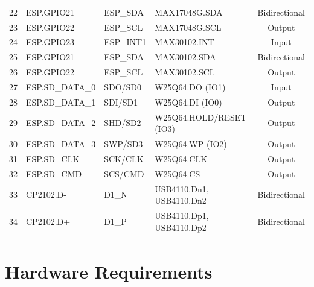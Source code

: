 \documentclass[10pt]{datasheet}
\begin{document}
\begin{longtable}{c | l | l | >{\raggedright\arraybackslash}p{4.5cm} | c}
    22 & ESP.GPIO21      & ESP\_SDA         & MAX17048G.SDA            & Bidirectional \\
    23 & ESP.GPIO22      & ESP\_SCL         & MAX17048G.SCL            & Output \\
    \hline
    24 & ESP.GPIO23      & ESP\_INT1        & MAX30102.INT             & Input  \\
    25 & ESP.GPIO21      & ESP\_SDA         & MAX30102.SDA             & Bidirectional \\
    26 & ESP.GPIO22      & ESP\_SCL         & MAX30102.SCL             & Output \\
    \hline
    27 & ESP.SD\_DATA\_0 & SDO/SD0          & W25Q64.DO (IO1)          & Input  \\
    28 & ESP.SD\_DATA\_1 & SDI/SD1          & W25Q64.DI (IO0)          & Output \\
    29 & ESP.SD\_DATA\_2 & SHD/SD2          & W25Q64.HOLD/RESET (IO3)  & Output \\
    30 & ESP.SD\_DATA\_3 & SWP/SD3          & W25Q64.WP (IO2)          & Output \\
    31 & ESP.SD\_CLK     & SCK/CLK          & W25Q64.CLK               & Output \\
    32 & ESP.SD\_CMD     & SCS/CMD          & W25Q64.CS                & Output \\
    \hline
    33 & CP2102.D-       & D1\_N            & USB4110.Dn1, USB4110.Dn2 & Bidirectional \\
    34 & CP2102.D+       & D1\_P            & USB4110.Dp1, USB4110.Dp2 & Bidirectional \\
\end{longtable}

\section{Hardware Requirements}
\end{document}
